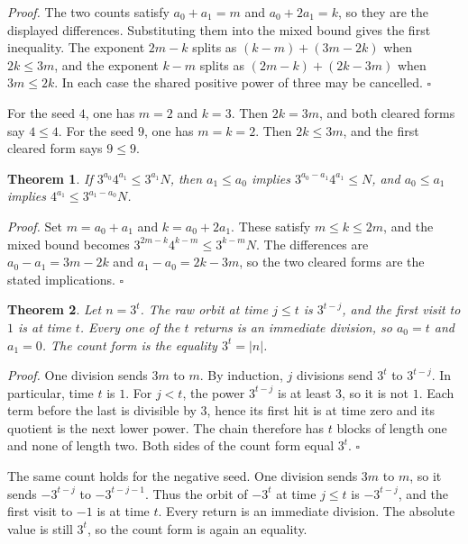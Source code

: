 \documentclass[11pt,letterpaper]{article}
\newtheorem{theorem}{Theorem}
\newenvironment{proof}{\noindent\textit{Proof.}}{\hfill\(\square\)}
\begin{document}
\begin{proof}
The two counts satisfy \(a_{0}+a_{1}=m\) and \(a_{0}+2a_{1}=k\), so they are the displayed differences. Substituting them into the mixed bound gives the first inequality. The exponent \(2m-k\) splits as \((k-m)+(3m-2k)\) when \(2k\le 3m\), and the exponent \(k-m\) splits as \((2m-k)+(2k-3m)\) when \(3m\le 2k\). In each case the shared positive power of three may be cancelled.
\end{proof}

For the seed \(4\), one has \(m=2\) and \(k=3\). Then \(2k=3m\), and both cleared forms say \(4\le 4\). For the seed \(9\), one has \(m=k=2\). Then \(2k\le 3m\), and the first cleared form says \(9\le 9\).

\begin{theorem}
\label{thm:countform}
If \(3^{a_{0}}4^{a_{1}}\le 3^{a_{1}}N\), then \(a_{1}\le a_{0}\) implies \(3^{a_{0}-a_{1}}4^{a_{1}}\le N\), and \(a_{0}\le a_{1}\) implies \(4^{a_{1}}\le 3^{a_{1}-a_{0}}N\).
\end{theorem}

\begin{proof}
Set \(m=a_{0}+a_{1}\) and \(k=a_{0}+2a_{1}\). These satisfy \(m\le k\le 2m\), and the mixed bound becomes \(3^{2m-k}4^{k-m}\le 3^{k-m}N\). The differences are \(a_{0}-a_{1}=3m-2k\) and \(a_{1}-a_{0}=2k-3m\), so the two cleared forms are the stated implications.
\end{proof}

\begin{theorem}
\label{thm:puredivision}
Let \(n=3^{t}\). The raw orbit at time \(j\le t\) is \(3^{t-j}\), and the first visit to \(1\) is at time \(t\). Every one of the \(t\) returns is an immediate division, so \(a_{0}=t\) and \(a_{1}=0\). The count form is the equality \(3^{t}=|n|\).
\end{theorem}

\begin{proof}
One division sends \(3m\) to \(m\). By induction, \(j\) divisions send \(3^{t}\) to \(3^{t-j}\). In particular, time \(t\) is \(1\). For \(j<t\), the power \(3^{t-j}\) is at least \(3\), so it is not \(1\). Each term before the last is divisible by \(3\), hence its first hit is at time zero and its quotient is the next lower power. The chain therefore has \(t\) blocks of length one and none of length two. Both sides of the count form equal \(3^{t}\).
\end{proof}

The same count holds for the negative seed. One division sends \(3m\) to \(m\), so it sends \(-3^{t-j}\) to \(-3^{t-j-1}\). Thus the orbit of \(-3^{t}\) at time \(j\le t\) is \(-3^{t-j}\), and the first visit to \(-1\) is at time \(t\). Every return is an immediate division. The absolute value is still \(3^{t}\), so the count form is again an equality.
\end{document}
